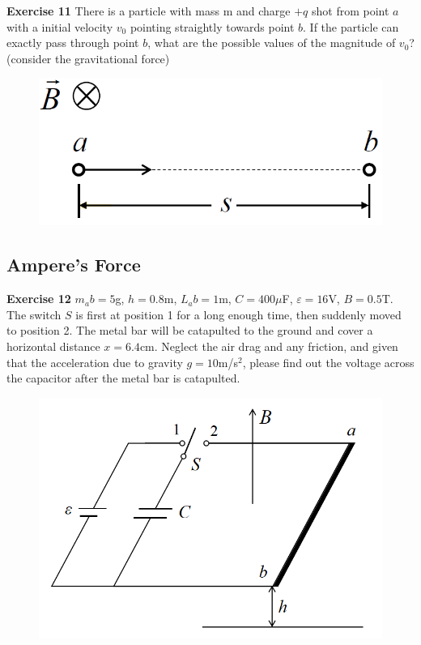 \documentclass{beamer}
\begin{document}
\begin{frame}{\bf Exercise 11}
    There is a particle with mass m and charge $+q$ shot from point $a$ 
    with a initial velocity $v_0$ pointing straightly towards point $b$. 
    If the particle can exactly pass through point $b$, what are the possible 
    values of the magnitude of $v_0$? (consider the gravitational force)

    \begin{figure}
        \centering 
        \includegraphics[scale=0.5]{images/Ex11.png}
    \end{figure}
\end{frame}


\subsection{\bf Ampere's Force}
\begin{frame}{\bf Exercise 12}
    $m_ab=5$g, $h=0.8$m, $L_ab=1$m, $C=400\mu$F, $\varepsilon=16$V, $B=0.5$T. 
    The switch $S$ is first at position 1 for a long enough time, 
    then suddenly moved to position 2. The metal bar will be 
    catapulted to the ground and cover a horizontal distance 
    $x=6.4$cm. Neglect the air drag and any friction, and given that the 
    acceleration due to gravity $g=10$m/s$^{2}$, please 
    find out the voltage across the capacitor after the 
    metal bar is catapulted.

    \begin{figure}[H]
        \centering
        \includegraphics[scale=0.45]{images/007.png}
    \end{figure}
\end{frame}
\end{document}
